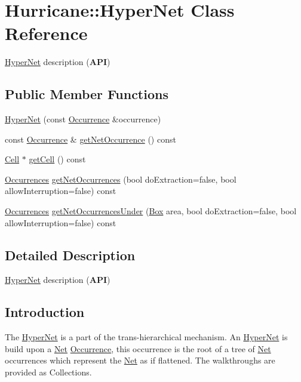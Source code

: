 \hypertarget{classHurricane_1_1HyperNet}{}\section{Hurricane\+:\+:Hyper\+Net Class Reference}
\label{classHurricane_1_1HyperNet}


\mbox{\hyperlink{classHurricane_1_1HyperNet}{Hyper\+Net}} description ({\bfseries A\+PI})  


\subsection*{Public Member Functions}
\begin{DoxyCompactItemize}
\item 
\mbox{\hyperlink{classHurricane_1_1HyperNet_a30bdc04b4dece8bdef66361fe4469175}{Hyper\+Net}} (const \mbox{\hyperlink{classHurricane_1_1Occurrence}{Occurrence}} \&occurrence)
\item 
const \mbox{\hyperlink{classHurricane_1_1Occurrence}{Occurrence}} \& \mbox{\hyperlink{classHurricane_1_1HyperNet_a327eab6dda243836becde745bfc53efa}{get\+Net\+Occurrence}} () const
\item 
\mbox{\hyperlink{classHurricane_1_1Cell}{Cell}} $\ast$ \mbox{\hyperlink{classHurricane_1_1HyperNet_a5a818c5887d1d8dd2e0a59e8a57c02d7}{get\+Cell}} () const
\item 
\mbox{\hyperlink{namespaceHurricane_a1912927c128eee859af62dbe4cbe0a6b}{Occurrences}} \mbox{\hyperlink{classHurricane_1_1HyperNet_a02180e650b1f2e5b87bf4774a5799ebc}{get\+Net\+Occurrences}} (bool do\+Extraction=false, bool allow\+Interruption=false) const
\item 
\mbox{\hyperlink{namespaceHurricane_a1912927c128eee859af62dbe4cbe0a6b}{Occurrences}} \mbox{\hyperlink{classHurricane_1_1HyperNet_ab278267a5f1d91bd22bc7fe411b3cfb0}{get\+Net\+Occurrences\+Under}} (\mbox{\hyperlink{classHurricane_1_1Box}{Box}} area, bool do\+Extraction=false, bool allow\+Interruption=false) const
\end{DoxyCompactItemize}


\subsection{Detailed Description}
\mbox{\hyperlink{classHurricane_1_1HyperNet}{Hyper\+Net}} description ({\bfseries A\+PI}) 

\hypertarget{classHurricane_1_1HyperNet_secHyperNetIntro}{}\subsection{Introduction}\label{classHurricane_1_1HyperNet_secHyperNetIntro}
The \mbox{\hyperlink{classHurricane_1_1HyperNet}{Hyper\+Net}} is a part of the trans-\/hierarchical mechanism. An \mbox{\hyperlink{classHurricane_1_1HyperNet}{Hyper\+Net}} is build upon a \mbox{\hyperlink{classHurricane_1_1Net}{Net}} \mbox{\hyperlink{classHurricane_1_1Occurrence}{Occurrence}}, this occurrence is the root of a tree of \mbox{\hyperlink{classHurricane_1_1Net}{Net}} occurrences which represent the \mbox{\hyperlink{classHurricane_1_1Net}{Net}} as if flattened. The walkthroughs are provided as Collections.

